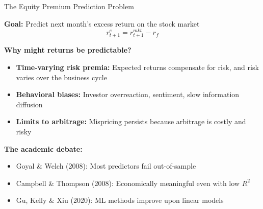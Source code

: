 \documentclass[10pt]{beamer}
\begin{document}
\begin{frame}{The Equity Premium Prediction Problem}

  \textbf{Goal:} Predict next month's excess return on the stock market
  \[
  r_{t+1}^e = r_{t+1}^{mkt} - r_f
  \]

  \vspace{0.5em}
  \textbf{Why might returns be predictable?}
  \begin{itemize}
    \item \textbf{Time-varying risk premia:} Expected returns compensate for risk, and risk varies over the business cycle
    \item \textbf{Behavioral biases:} Investor overreaction, sentiment, slow information diffusion
    \item \textbf{Limits to arbitrage:} Mispricing persists because arbitrage is costly and risky
  \end{itemize}

  \vspace{0.5em}
  \textbf{The academic debate:}
  \begin{itemize}
    \item Goyal \& Welch (2008): Most predictors fail out-of-sample
    \item Campbell \& Thompson (2008): Economically meaningful even with low $R^2$
    \item Gu, Kelly \& Xiu (2020): ML methods improve upon linear models
  \end{itemize}
\end{frame}

\end{document}
